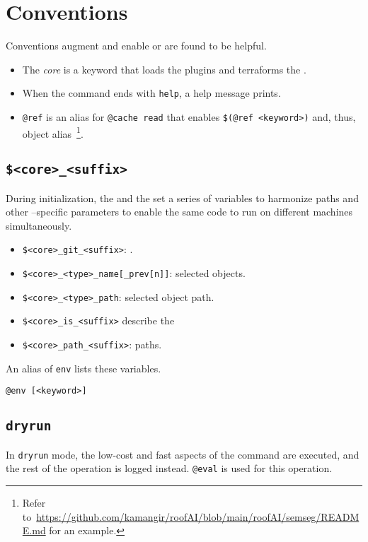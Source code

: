 \section{Conventions}
\label{conventions}

Conventions augment and enable  or are found to be helpful.
%
\begin{itemize}
    \item The \emph{core} is a {keyword} that loads the plugins and terraforms the .
    \item When the command ends with \texttt{help}, a help message prints.
    \item \texttt{@ref} is an alias for \texttt{@cache read} that enables \texttt{\$(@ref <keyword>)} and, thus, object alias~\footnote{Refer to~\url{https://github.com/kamangir/roofAI/blob/main/roofAI/semseg/README.md} for an example.}.
\end{itemize}  

\subsection{\texttt{\$<core>\_<suffix>}}
\label{awareness}

During initialization, the  and the  set a series of variables to harmonize paths and other --specific parameters to enable the same code to run on different machines simultaneously. 
%
\begin{itemize}
    \item{\texttt{\$<core>\_git\_<suffix>}: .}
    \item{\texttt{\$<core>\_<type>\_name[\_prev[n]]}: selected objects.}
    \item{\texttt{\$<core>\_<type>\_path}: selected object path.}
    \item{\texttt{\$<core>\_is\_<suffix>} describe the }
    \item{\texttt{\$<core>\_path\_<suffix>}: paths.}
\end{itemize}
%
An alias of \texttt{env} lists these variables.
%
\begin{verbatim}
@env [<keyword>]
\end{verbatim}

\subsection{\texttt{dryrun}}
\label{dryrun}

In \texttt{dryrun} mode, the low-cost and fast aspects of the command are executed, and the rest of the operation is logged instead. \texttt{@eval} is used for this operation. 








